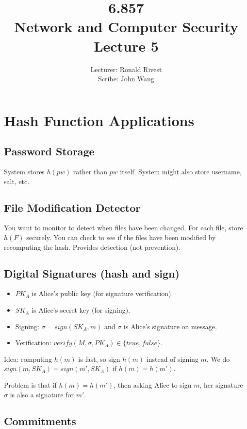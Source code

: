 \documentclass[psamsfonts]{amsart}
\title{6.857 \\
Network and Computer Security \\
Lecture 5}
\author{Lecturer: Ronald Rivest\\
Scribe: John Wang}
\begin{document}
\maketitle

\section{Hash Function Applications}

\subsection{Password Storage}

System stores $h(pw)$ rather than $pw$ itself. System might also store username, salt, etc.

\subsection{File Modification Detector}

You want to monitor to detect when files have been changed. For each file, store $h(F)$ securely. You can check to see if the files have been modified by recomputing the hash. Provides detection (not prevention).

\subsection{Digital Signatures (hash and sign)}

\begin{itemize}
  \item $PK_A$ is Alice's public key (for signature verification). 
  \item $SK_A$ is Alice's secret key (for signing). 
  \item Signing: $\sigma = sign(SK_A, m)$ and $\sigma$ is Alice's signature on message. 
  \item Verification: $verify(M, \sigma, PK_A) \in \{true, false\}$. 
\end{itemize}

Idea: computing $h(m)$ is fast, so sign $h(m)$ instead of signing $m$. We do $sign(m, SK_A) = sign(m', SK_A)$ if $h(m) = h(m')$.

Problem is that if $h(m) = h(m')$, then asking Alice to sign $m$, her signature $\sigma$ is also a signature for $m'$.

\subsection{Commitments}
\end{document}
